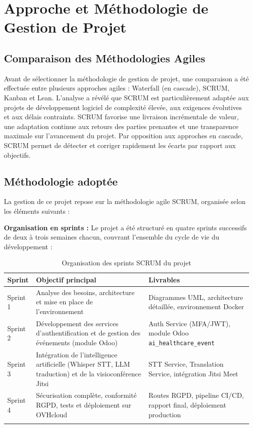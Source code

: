 \section{Approche et Méthodologie de Gestion de Projet}

\subsection{Comparaison des Méthodologies Agiles}
Avant de sélectionner la méthodologie de gestion de projet, une comparaison a été effectuée entre plusieurs approches agiles : Waterfall (en cascade), SCRUM, Kanban et Lean. L'analyse a révélé que SCRUM est particulièrement adaptée aux projets de développement logiciel de complexité élevée, aux exigences évolutives et aux délais contraints. SCRUM favorise une livraison incrémentale de valeur, une adaptation continue aux retours des parties prenantes et une transparence maximale sur l'avancement du projet. Par opposition aux approches en cascade, SCRUM permet de détecter et corriger rapidement les écarts par rapport aux objectifs.

\subsection{Méthodologie adoptée}
La gestion de ce projet repose sur la méthodologie agile SCRUM, organisée selon les éléments suivants :

\textbf{Organisation en sprints :} Le projet a été structuré en quatre sprints successifs de deux à trois semaines chacun, couvrant l'ensemble du cycle de vie du développement :

\begin{longtable}{|m{2cm}|m{5cm}|m{6cm}|}
\hline
\textbf{Sprint} & \textbf{Objectif principal} & \textbf{Livrables} \\
\hline
\endhead
\endfoot
\endlastfoot
\hline
Sprint 1 & Analyse des besoins, architecture et mise en place de l'environnement & Diagrammes UML, architecture détaillée, environnement Docker \\
\hline
Sprint 2 & Développement des services d'authentification et de gestion des événements (module Odoo) & Auth Service (MFA/JWT), module Odoo \texttt{ai\_healthcare\_event} \\
\hline
Sprint 3 & Intégration de l'intelligence artificielle (Whisper STT, LLM traduction) et de la visioconférence Jitsi & STT Service, Translation Service, intégration Jitsi Meet \\
\hline
Sprint 4 & Sécurisation complète, conformité RGPD, tests et déploiement sur OVHcloud & Routes RGPD, pipeline CI/CD, rapport final, déploiement production \\
\hline
\captionsetup{justification=centering,margin=2cm}
\caption{Organisation des sprints SCRUM du projet}
\label{tab:sprints}
\end{longtable}

